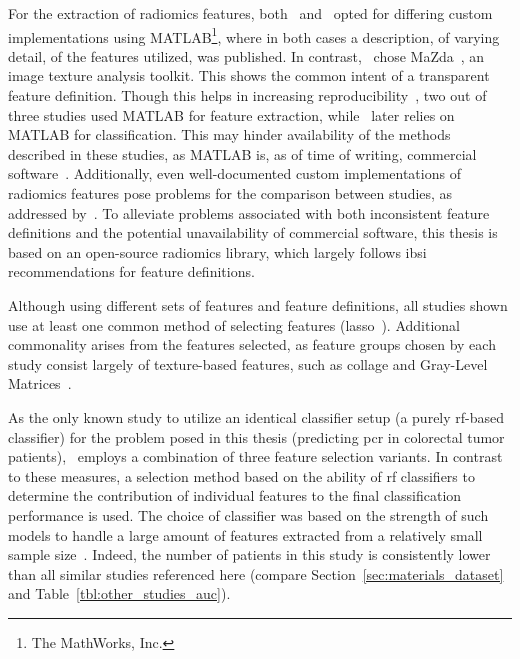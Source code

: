 For the extraction of radiomics features, both~\cite{radiomics_analysis_pcr_rectal}
and~\cite{multisite_rectal_radiomics} opted for differing custom implementations
using MATLAB\footnote{The MathWorks, Inc.}, where in both cases a description, 
of varying detail, of the features utilized, was published. In contrast,~\cite{rectal_radiomics_svm_rf} chose MaZda~\cite{mazda},
an image texture analysis toolkit. This shows the common intent of a transparent 
feature definition. Though this helps in increasing
reproducibility~\cite{ibsi_paper,radiomics_process_and_challenges}, two 
out of three studies used MATLAB for feature extraction, 
while~\cite{rectal_radiomics_svm_rf} later relies on MATLAB for classification.
This may hinder availability of the methods described in these studies, as 
MATLAB is, as of time of writing, commercial software~\cite{matlab}.
Additionally, even well-documented custom implementations of radiomics features pose 
problems for the comparison between studies, as addressed by~\cite{ibsi_paper}.
To alleviate problems associated with both inconsistent feature definitions and
the potential unavailability of commercial software, this thesis is based on an 
open-source radiomics library, which largely follows \ac{ibsi} recommendations
for feature definitions.

Although using different sets of features and feature definitions, all studies
shown use at least one common method of selecting features (\ac{lasso}~\cite{lasso}).
Additional commonality arises from the features selected, as feature groups
chosen by each study consist largely of texture-based features, such as 
\ac{collage} and Gray-Level Matrices~\cite{radiomics_analysis_pcr_rectal,rectal_radiomics_svm_rf,multisite_rectal_radiomics,collage}.

As the only known study to utilize an identical classifier setup (a purely 
\ac{rf}-based classifier) for the problem posed in this thesis (predicting \ac{pcr} 
in colorectal tumor patients),~\cite{multisite_rectal_radiomics} employs a 
combination of three feature selection variants. In contrast to these measures, 
a selection method based on the ability of \ac{rf} classifiers to determine the
contribution of individual features to the final classification performance is 
used. The choice of  classifier was based on the strength of such 
models to handle a large amount of features extracted from a relatively small 
sample size~\cite{random_forests_article,random_forests_web}. Indeed, the
number of patients in this study is consistently lower than all similar studies
referenced here (compare Section~\ref{sec:materials_dataset} and 
Table~\ref{tbl:other_studies_auc}).


